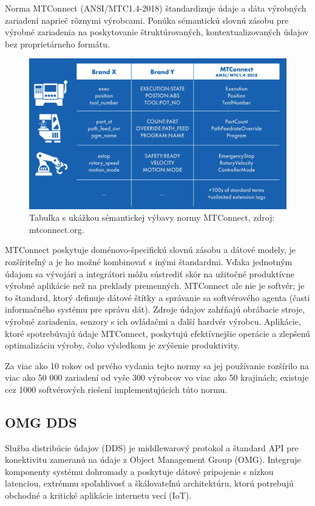 \documentclass[]{tukediphc}
\begin{document}
Norma MTConnect (ANSI/MTC1.4-2018) štandardizuje údaje a dáta výrobných zariadení naprieč rôznymi výrobcami. Ponúka sémantickú slovnú zásobu pre výrobné zariadenia na poskytovanie štruktúrovaných, kontextualizovaných údajov bez proprietárneho formátu.

\begin{figure}[h!]
	\centering
	\includegraphics[width=.8\textwidth,angle=0]{figures/mtconnect.jpg}
	\caption{Tabuľka s ukážkou sémantickej výbavy normy MTConnect, zdroj: mtconnect.org.}
\end{figure}

MTConnect poskytuje doménovo-špecifickú slovnú zásobu a dátové modely, je rozšíriteľný a je ho možné kombinovať s inými štandardmi. Vďaka jednotným údajom sa vývojári a integrátori môžu sústrediť skôr na užitočné produktívne výrobné aplikácie než na preklady premenných. MTConnect ale nie je softvér; je to štandard, ktorý definuje dátové štítky a správanie sa softvérového agenta (časti informačného systému pre správu dát). Zdroje údajov zahŕňajú obrábacie stroje, výrobné zariadenia, senzory s ich ovládačmi a ďalší hardvér výrobcu. Aplikácie, ktoré spotrebúvajú údaje MTConnect, poskytujú efektívnejšie operácie a zlepšenú optimalizáciu výroby, čoho výsledkom je zvýšenie produktivity.

Za viac ako 10 rokov od prvého vydania tejto normy sa jej používanie rozšírilo na viac ako 50 000 zariadení od vyše 300 výrobcov vo viac ako 50 krajinách; existuje cez 1000 softvérových riešení implementujúcich túto normu.

\subsection{OMG DDS}

Služba distribúcie údajov (DDS) je middlewarový protokol a štandard API pre konektivitu zameranú na údaje z Object Management Group (OMG). Integruje komponenty systému dohromady a poskytuje dátové pripojenie s nízkou latenciou, extrémnu spoľahlivosť a škálovateľnú architektúru, ktorú potrebujú obchodné a kritické aplikácie internetu vecí (IoT).
\end{document}
